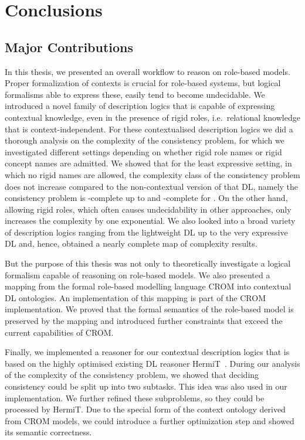 \chapter{Conclusions}
\label{cha:conclusions}


\section{Major Contributions}
\label{sec:major-contributions}

In this thesis, we presented an overall workflow to reason on role-based models. Proper
formalization of contexts is crucial for role-based systems, but logical formalisms able to express
these, easily tend to become undecidable.  We introduced a novel family of description logics that
is capable of expressing contextual knowledge, even in the presence of rigid roles, i.e.\ relational
knowledge that is context-independent.  For these contextualised description logics we did a
thorough analysis on the complexity of the consistency problem, for which we investigated different
settings depending on whether rigid role names or rigid concept names are admitted. We showed that
for the least expressive setting, in which no rigid names are allowed, the complexity class of the
consistency problem does not increase compared to the non-contextual version of that DL, namely the
consistency problem is \ExpTime-complete up to \SHOQSHOQ and \NExpTime-complete for \SHOIQSHOIQ. On
the other hand, allowing rigid roles, which often causes undecidability in other approaches, only
increases the complexity by one exponential.
%
We also looked into a broad variety of description logics
ranging from the lightweight DL \EL up to the very expressive DL \SHOIQ and, hence, obtained a
nearly complete map of complexity results.

But the purpose of this thesis was not only to theoretically investigate a logical formalism capable
of reasoning on role-based models. We also presented a mapping from the formal role-based modelling
language CROM into contextual DL ontologies. An implementation of this mapping is part of the CROM
implementation. We proved that the formal semantics of the role-based model is preserved
by the mapping and introduced further constraints that exceed the current capabilities of CROM.

Finally, we implemented a reasoner for our contextual description logics that is based on the highly
optimised existing DL reasoner HermiT~\cite{GHM-JAR14}.  During our analysis of the complexity of
the consistency problem, we showed that deciding consistency could be split up into two
subtasks. This idea was also used in our implementation.  We further refined these subproblems, so
they could be processed by HermiT.  Due to the special form of the context ontology derived from
CROM models, we could introduce a further optimization step and showed its semantic correctness.




